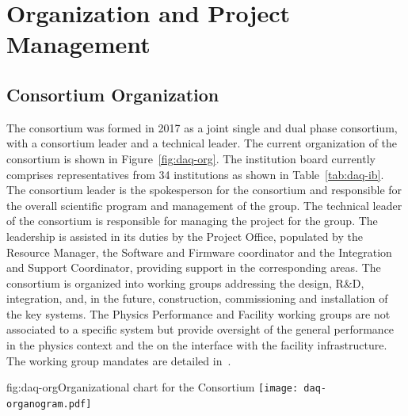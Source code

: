 \section{Organization and Project Management}
\label{sec:sp-daq:organization}


\subsection{Consortium Organization}

The  consortium was formed in 2017 as a joint single and
dual phase consortium, with a consortium leader and a technical
leader. The current organization of the consortium is shown in
Figure~\ref{fig:daq-org}. The  institution board currently comprises
representatives from 34 institutions as shown in Table~\ref{tab:daq-ib}. The consortium leader is the spokesperson for the consortium and responsible for the overall scientific program and management of the group. The technical leader of the consortium is responsible for
managing the project for the group. The leadership is assisted in its duties by the Project Office, populated by the Resource Manager, the Software and Firmware coordinator and the Integration and Support Coordinator, providing support in the corresponding areas. 
The consortium is organized into working groups addressing the design,
R\&D, integration, and, in the future, construction, commissioning and installation of the key  systems. The Physics Performance and Facility working groups are not associated to a specific system but provide oversight of the general  performance in the physics context and the on the interface with the facility infrastructure. The  working group mandates are detailed in~.

\begin{dunefigure}{fig:daq-org}{Organizational chart for the  Consortium
}
  \texttt{[image: daq-organogram.pdf]}
\end{dunefigure}

